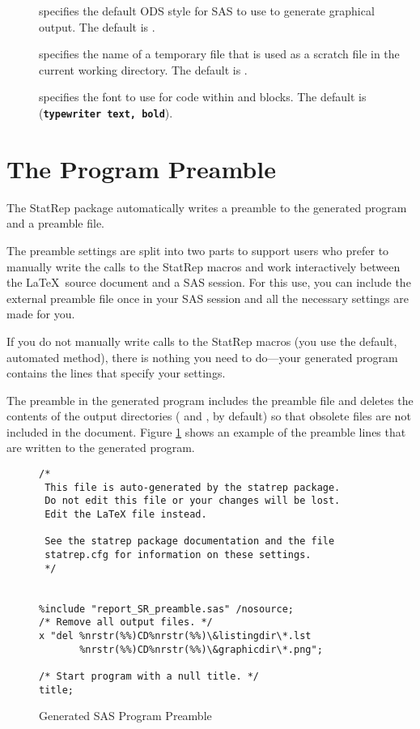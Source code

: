 \documentclass[article,oneside]{memoir}
\newcommand*{\StatRep}{\textsf{StatRep}\xspace}
\begin{document}
\begin{description}
    
    \item[] specifies the default ODS style for SAS to use to generate
    graphical output. The default is .
    
     \item[] specifies the name of a temporary file
     that is used as a scratch file in the current working directory. 
     The default is .
     
     \item[] specifies the font to use for code within  and 
      blocks. The default is  
     (\texttt{\textbf{typewriter text, bold}}).
     
     \end{description}

  \section{The Program Preamble}
  
The \StatRep package automatically writes a preamble to the generated program and a preamble file.

The preamble settings are split into two parts to support users who prefer to
manually write the calls to the \StatRep macros and work interactively between the
\LaTeX\ source document and a SAS session.  For this use, you can include the external
preamble file once in your SAS session and all the necessary settings are made for you.

If you do not manually write calls to the \StatRep macros (you use the default, automated method),
there is nothing you need to do---your generated program contains the lines that specify your settings.

The preamble in the generated program includes the preamble file and deletes the contents of the 
output directories ( and   , by default) so that obsolete files are 
not included in the document.
Figure \ref{fig:pgmpreamble} shows an example of the preamble lines 
that are written to the generated program.
\begin{figure}[H]
\begin{snugshade}
\begin{verbatim}
/*
 This file is auto-generated by the statrep package.
 Do not edit this file or your changes will be lost.
 Edit the LaTeX file instead.
 
 See the statrep package documentation and the file
 statrep.cfg for information on these settings.
 */
 
 
%include "report_SR_preamble.sas" /nosource;
/* Remove all output files. */
x "del %nrstr(%%)CD%nrstr(%%)\&listingdir\*.lst 
       %nrstr(%%)CD%nrstr(%%)\&graphicdir\*.png"; 

/* Start program with a null title. */
title;
\end{verbatim}
\end{snugshade}
\caption{Generated SAS Program Preamble}\label{fig:pgmpreamble}
\end{figure}
\end{document}
